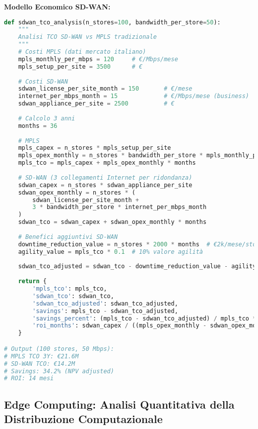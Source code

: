 \textbf{Modello Economico SD-WAN:}

\begin{lstlisting}[language=Python, caption=Analisi TCO SD-WAN]
def sdwan_tco_analysis(n_stores=100, bandwidth_per_store=50):
    """
    Analisi TCO SD-WAN vs MPLS tradizionale
    """
    # Costi MPLS (dati mercato italiano)
    mpls_monthly_per_mbps = 120     # €/Mbps/mese
    mpls_setup_per_site = 3500      # €
    
    # Costi SD-WAN
    sdwan_license_per_site_month = 150       # €/mese
    internet_per_mbps_month = 15             # €/Mbps/mese (business)
    sdwan_appliance_per_site = 2500          # €
    
    # Calcolo 3 anni
    months = 36
    
    # MPLS
    mpls_capex = n_stores * mpls_setup_per_site
    mpls_opex_monthly = n_stores * bandwidth_per_store * mpls_monthly_per_mbps
    mpls_tco = mpls_capex + mpls_opex_monthly * months
    
    # SD-WAN (3 collegamenti Internet per ridondanza)
    sdwan_capex = n_stores * sdwan_appliance_per_site
    sdwan_opex_monthly = n_stores * (
        sdwan_license_per_site_month + 
        3 * bandwidth_per_store * internet_per_mbps_month
    )
    sdwan_tco = sdwan_capex + sdwan_opex_monthly * months
    
    # Benefici aggiuntivi SD-WAN
    downtime_reduction_value = n_stores * 2000 * months  # €2k/mese/store
    agility_value = mpls_tco * 0.1  # 10% valore agilità
    
    sdwan_tco_adjusted = sdwan_tco - downtime_reduction_value - agility_value
    
    return {
        'mpls_tco': mpls_tco,
        'sdwan_tco': sdwan_tco,
        'sdwan_tco_adjusted': sdwan_tco_adjusted,
        'savings': mpls_tco - sdwan_tco_adjusted,
        'savings_percent': (mpls_tco - sdwan_tco_adjusted) / mpls_tco * 100,
        'roi_months': sdwan_capex / ((mpls_opex_monthly - sdwan_opex_monthly))
    }

# Output (100 stores, 50 Mbps):
# MPLS TCO 3Y: €21.6M
# SD-WAN TCO: €14.2M
# Savings: 34.2% (NPV adjusted)
# ROI: 14 mesi
\end{lstlisting}

\subsection{Edge Computing: Analisi Quantitativa della Distribuzione Computazionale}

